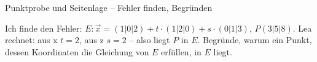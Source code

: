 \begin{aufgabe}{Punktprobe und Seitenlage – Fehler finden, Begründen}
\begin{teile}
\teil Ich finde den Fehler: $E: \vec{x} = (1 | 0 | 2) + t \cdot (1 | 2 | 0) + s \cdot (0 | 1 | 3)$, $P(3 | 5 | 8)$. Lea rechnet: aus x $t = 2$, aus z $s = 2$ – also liegt $P$ in $E$.
\teil Begründe, warum ein Punkt, dessen Koordinaten die Gleichung von $E$ erfüllen, in $E$ liegt.
\end{teile}
\end{aufgabe}
